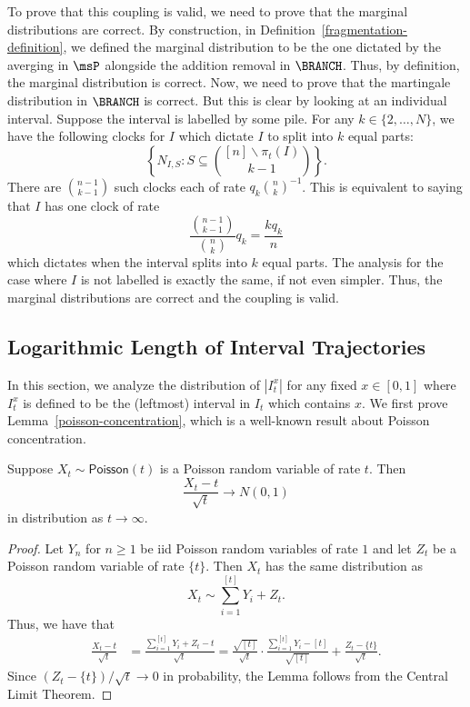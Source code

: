 \documentclass[12pt]{article}
\begin{document}
	To prove that this coupling is valid, we need to prove that the marginal distributions are correct. By construction, in Definition~\ref{fragmentation-definition}, we defined the marginal distribution to be the one dictated by the averging in $\msP$ alongside the addition removal in $\BRANCH$. Thus, by definition, the marginal distribution is correct. Now, we need to prove that the martingale distribution in $\BRANCH$ is correct. But this is clear by looking at an individual interval. Suppose the interval is labelled by some pile. For any $k \in \{2, \ldots, N\}$, we have the following clocks for $I$ which dictate $I$ to split into $k$ equal parts:
	\[
		\left \{ N_{I, S} : S \subseteq \binom{[n] \backslash \pi_t(I)}{k-1}\right \}.
	\]
	There are $\binom{n-1}{k-1}$ such clocks each of rate $q_k \binom{n}{k}^{-1}$. This is equivalent to saying that $I$ has one clock of rate
	\[
		\frac{\binom{n-1}{k-1}}{\binom{n}{k}} q_k = \frac{kq_k}{n}
	\]
	which dictates when the interval splits into $k$ equal parts. The analysis for the case where $I$ is not labelled is exactly the same, if not even simpler. Thus, the marginal distributions are correct and the coupling is valid. 



\subsection{Logarithmic Length of Interval Trajectories}
In this section, we analyze the distribution of $|I_t^x|$ for any fixed $x \in [0, 1]$ where $I_t^x$ is defined to be the (leftmost) interval in $I_t$ which contains $x$. We first prove Lemma~\ref{poisson-concentration}, which is a well-known result about Poisson concentration. 

\begin{lem} \label{poisson-concentration}
	Suppose $X_t \sim \mathsf{Poisson}(t)$ is a Poisson random variable of rate $t$. Then 
	\[
		\frac{X_t - t}{\sqrt{t}} \longrightarrow N(0, 1)
	\]
	in distribution as $t \to \infty$. 
\end{lem}

\begin{proof}
	Let $Y_n$ for $n \geq 1$ be iid Poisson random variables of rate $1$ and let $Z_t$ be a Poisson random variable of rate $\{t\}$. Then $X_t$ has the same distribution as 
	\[
		X_t \sim \sum_{i = 1}^{[t]} Y_i + Z_t.	
	\]
	Thus, we have that 
	\begin{align*}
		\frac{X_t - t}{\sqrt{t}} & = \frac{\sum_{i = 1}^{[t]} Y_i + Z_t-t}{\sqrt{t}} = \frac{\sqrt{[t]}}{\sqrt{t}} \cdot \frac{\sum_{i = 1}^{[t]} Y_i - [t]}{\sqrt{[t]}} + \frac{Z_t - \{t\}}{\sqrt{t}}.
	\end{align*}
	Since $(Z_t - \{t\})/\sqrt{t} \to 0$ in probability, the Lemma follows from the Central Limit Theorem. 
\end{proof}
\end{document}

